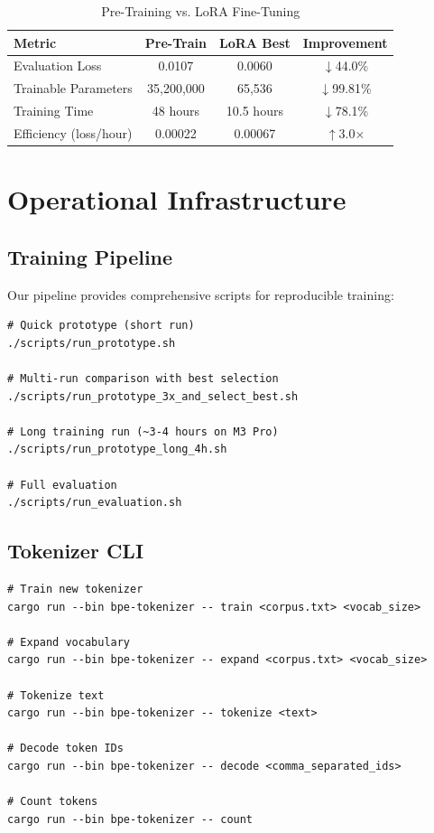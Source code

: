 \documentclass[11pt,a4paper,twocolumn]{article}
\theoremstyle{plain}
\theoremstyle{definition}
\begin{document}
\begin{table}[H]
\centering
\caption{Pre-Training vs. LoRA Fine-Tuning}
\begin{tabular}{lccc}
\toprule
\textbf{Metric} & \textbf{Pre-Train} & \textbf{LoRA Best} & \textbf{Improvement} \\
\midrule
Evaluation Loss & 0.0107 & 0.0060 & $\downarrow$44.0\% \\
Trainable Parameters & 35,200,000 & 65,536 & $\downarrow$99.81\% \\
Training Time & 48 hours & 10.5 hours & $\downarrow$78.1\% \\
Efficiency (loss/hour) & 0.00022 & 0.00067 & $\uparrow$3.0$\times$ \\
\bottomrule
\end{tabular}
\end{table}

\section{Operational Infrastructure}

\subsection{Training Pipeline}

Our pipeline provides comprehensive scripts for reproducible training:

\begin{lstlisting}[caption=Training Pipeline Commands]
# Quick prototype (short run)
./scripts/run_prototype.sh

# Multi-run comparison with best selection
./scripts/run_prototype_3x_and_select_best.sh

# Long training run (~3-4 hours on M3 Pro)
./scripts/run_prototype_long_4h.sh

# Full evaluation
./scripts/run_evaluation.sh
\end{lstlisting}

\subsection{Tokenizer CLI}

\begin{lstlisting}[caption=Tokenizer Command-Line Interface]
# Train new tokenizer
cargo run --bin bpe-tokenizer -- train <corpus.txt> <vocab_size>

# Expand vocabulary
cargo run --bin bpe-tokenizer -- expand <corpus.txt> <vocab_size>

# Tokenize text
cargo run --bin bpe-tokenizer -- tokenize <text>

# Decode token IDs
cargo run --bin bpe-tokenizer -- decode <comma_separated_ids>

# Count tokens
cargo run --bin bpe-tokenizer -- count
\end{lstlisting}
\end{document}
